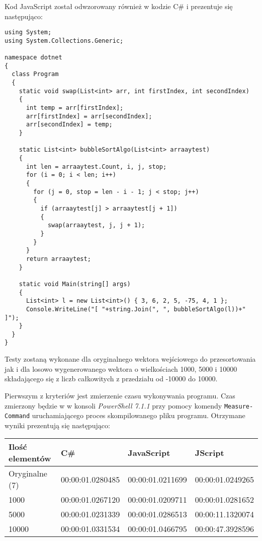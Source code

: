 \par Kod JavaScript został odwzorowany również w kodzie C\# i prezentuje się następująco:

\begin{lstlisting}[language=CSharp, caption={Odwzorowany kod JavaScript w języku C\# algorytmu sortowania bąbelkowego.}, label=alg:alg1]
using System;
using System.Collections.Generic;

namespace dotnet
{
  class Program
  {
    static void swap(List<int> arr, int firstIndex, int secondIndex)
    {
      int temp = arr[firstIndex];
      arr[firstIndex] = arr[secondIndex];
      arr[secondIndex] = temp;
    }

    static List<int> bubbleSortAlgo(List<int> arraaytest)
    {
      int len = arraaytest.Count, i, j, stop;
      for (i = 0; i < len; i++)
      {
        for (j = 0, stop = len - i - 1; j < stop; j++)
        {
          if (arraaytest[j] > arraaytest[j + 1])
          {
            swap(arraaytest, j, j + 1);
          }
        }
      }
      return arraaytest;
    }

    static void Main(string[] args)
    {
      List<int> l = new List<int>() { 3, 6, 2, 5, -75, 4, 1 };
      Console.WriteLine("[ "+string.Join(", ", bubbleSortAlgo(l))+" ]");
    }
  }
}
\end{lstlisting}

\par Testy zostaną wykonane dla oryginalnego wektora wejściowego do przesortowania jak i dla losowo wygenerowanego wektora o wielkościach 1000, 5000 i 10000 składającego się z liczb całkowitych z przedziału od -10000 do 10000.

\par Pierwszym z kryteriów jest zmierzenie czasu wykonywania programu. Czas zmierzony będzie w w konsoli \textit{PowerShell 7.1.1} przy pomocy komendy \texttt{Measure-Command} uruchamiającego proces skompilowanego pliku programu. Otrzymane wyniki prezentują się następująco:

\begin{table}[h!]
  \centering
  \begin{tabular}{|l|l|l|l|}
  \hline
  Ilość elementów & C\#              & JavaScript       & JScript          \\ \hline
  Oryginalne (7)  & 00:00:01.0280485 & 00:00:01.0211699 & 00:00:01.0249265 \\ \hline
  1000            & 00:00:01.0267120 & 00:00:01.0209711 & 00:00:01.0281652 \\ \hline
  5000            & 00:00:01.0231339 & 00:00:01.0286513 & 00:00:11.1320074 \\ \hline
  10000           & 00:00:01.0331534 & 00:00:01.0466795 & 00:00:47.3928596 \\ \hline
  \end{tabular}
\end{table}

